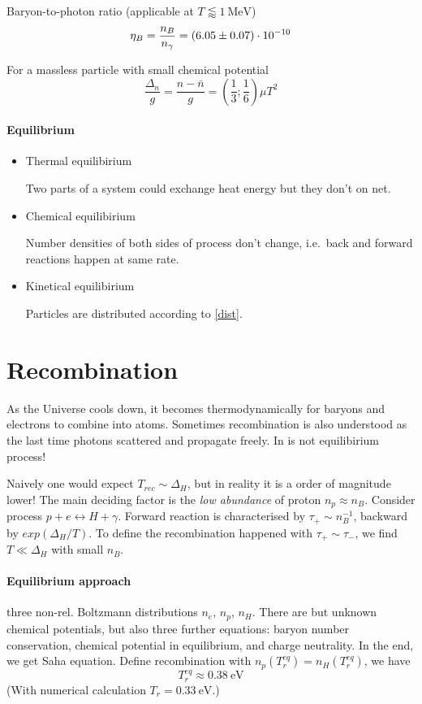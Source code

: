 \documentclass[12pt, a4paper, DIV=15]{article}
\numberwithin{equation}{section}
\begin{document}
Baryon-to-photon ratio (applicable at $T \lessapprox \SI{1}{\mega\eV}$)
\begin{equation}
   \eta_B = \frac{n_B}{n_\gamma} = (\num{6.05 +- 0.07} )\cdot 10^{-10}
\end{equation}

For a massless particle with small chemical potential
\begin{equation}
   \frac{\Delta_n}{g} = \frac{n - \bar{n}}{g} = (\frac{1}{3}; \frac{1}{6}) \mu T^2
\end{equation}
\paragraph{Equilibrium}
\begin{itemize}
   \item  Thermal equilibirium

      Two parts of a system could exchange heat energy but they don't on net.

   \item Chemical equilibirium

      Number densities of both sides of process don't change, i.e.~back and forward reactions happen at same rate.

   \item Kinetical equilibirium

      Particles are distributed according to \eqref{dist}.
\end{itemize}

\section{Recombination}
As the Universe cools down, it becomes thermodynamically for baryons and electrons to combine into atoms. Sometimes recombination is also understood as the last time photons scattered and propagate freely. In is not equilibirium process!

Naively one would expect $T_{rec} \sim \Delta_H$, but in reality it is a order of magnitude lower! The main deciding factor is the \textit{low abundance} of proton $n_p \approx n_B$. Consider process $p + e \leftrightarrow H + \gamma$. Forward reaction is characterised by $\tau_+ \sim n_B^{-1}$,  backward  by $exp(\Delta_H / T)$. To define the recombination happened with $\tau_+ \sim \tau_-$, we find $T \ll \Delta_H $ with small $n_B$.

\paragraph{Equilibrium approach} three non-rel. Boltzmann distributions $n_e$, $n_p$, $n_H$. There are but unknown chemical potentials, but also three further equations: baryon number conservation, chemical potential in equilibrium, and charge neutrality. In the end, we get Saha equation. Define recombination with $n_p (T^{eq}_r) = n_H(T_r^{eq})$, we have
\begin{equation}
   T_r^{eq} \approx \SI{0.38}{\eV}
\end{equation}
(With numerical calculation $T_r = \SI{0.33}{\eV}$.)
\end{document}
